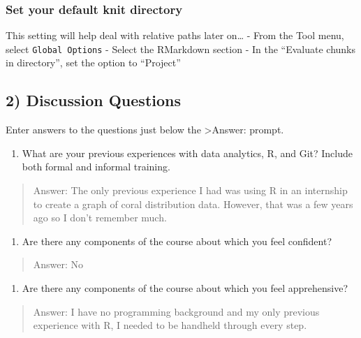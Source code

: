 \documentclass[
]{article}
\providecommand{\tightlist}{%
  \setlength{\itemsep}{0pt}\setlength{\parskip}{0pt}}
\begin{document}
\hypertarget{set-your-default-knit-directory}{%
\subsubsection{Set your default knit
directory}\label{set-your-default-knit-directory}}

This setting will help deal with relative paths later on\ldots{} - From
the Tool menu, select \texttt{Global\ Options} - Select the RMarkdown
section - In the ``Evaluate chunks in directory'', set the option to
``Project''

\hypertarget{discussion-questions}{%
\subsection{2) Discussion Questions}\label{discussion-questions}}

Enter answers to the questions just below the \textgreater Answer:
prompt.

\begin{enumerate}
\def\labelenumi{\arabic{enumi}.}
\tightlist
\item
  What are your previous experiences with data analytics, R, and Git?
  Include both formal and informal training.
\end{enumerate}

\begin{quote}
Answer: The only previous experience I had was using R in an internship
to create a graph of coral distribution data. However, that was a few
years ago so I don't remember much.
\end{quote}

\begin{enumerate}
\def\labelenumi{\arabic{enumi}.}
\setcounter{enumi}{1}
\tightlist
\item
  Are there any components of the course about which you feel confident?
\end{enumerate}

\begin{quote}
Answer: No
\end{quote}

\begin{enumerate}
\def\labelenumi{\arabic{enumi}.}
\setcounter{enumi}{2}
\tightlist
\item
  Are there any components of the course about which you feel
  apprehensive?
\end{enumerate}

\begin{quote}
Answer: I have no programming background and my only previous experience
with R, I needed to be handheld through every step.
\end{quote}
\end{document}

